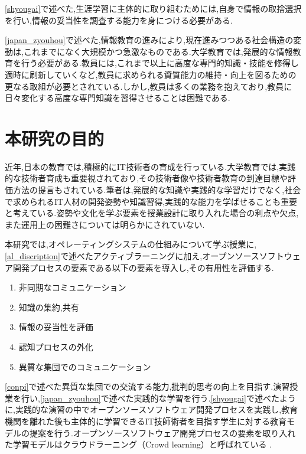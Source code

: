 \documentclass[11pt, a4paper]{jreport}
\begin{document}
\ref{shyougai}で述べた,生涯学習に主体的に取り組むためには,自身で情報の取捨選択を行い,情報の妥当性を調査する能力を身につける必要がある.

\ref{japan_zyouhou}で述べた,情報教育の進みにより,現在進みつつある社会構造の変動は,これまでになく大規模かつ急激なものである.大学教育では,発展的な情報教育を行う必要がある.教員には,これまで以上に高度な専門的知識・技能を修得し適時に刷新していくなど,教員に求められる資質能力の維持・向上を図るための更なる取組が必要とされている.しかし,教員は多くの業務を抱えており,教員に日々変化する高度な専門知識を習得させることは困難である\cite{bib:kyouinn_zituzyou}.

\section{本研究の目的}

近年,日本の教育では,積極的にIT技術者の育成を行っている.大学教育では,実践的な技術者育成も重要視されており,その技術者像や技術者教育の到達目標や評価方法の提言もされている.筆者は,発展的な知識や実践的な学習だけでなく,社会で求められるIT人材の開発姿勢や知識習得,実践的な能力を学ばせることも重要と考えている.姿勢や文化を学ぶ要素を授業設計に取り入れた場合の利点や欠点,また運用上の困難さについては明らかにされていない.

本研究では,オペレーティングシステムの仕組みについて学ぶ授業に,\ref{al_discription}で述べたアクティブラーニングに加え,オープンソースソフトウェア開発プロセスの要素である以下の要素を導入し,その有用性を評価する.

\begin{enumerate}[label=\textbf{(\alph*)}]
\item 非同期なコミュニケーション
\item 知識の集約,共有
\item 情報の妥当性を評価
\item 認知プロセスの外化
\item 異質な集団でのコミュニケーション
\end{enumerate}

\ref{conpi}で述べた異質な集団での交流する能力,批判的思考の向上を目指す.演習授業を行い,\ref{japan_zyouhou}で述べた実践的な学習を行う.\ref{shyougai}で述べたように,実践的な演習の中でオープンソースソフトウェア開発プロセスを実践し,教育機関を離れた後も主体的に学習できるIT技師術者を目指す学生に対する教育モデルの提案を行う.オープンソースソフトウェア開発プロセスの要素を取り入れた学習モデルはクラウドラーニング（Crowd learning）と呼ばれている\cite{bib:oss1} \cite{bib:oss2}.
\end{document}
